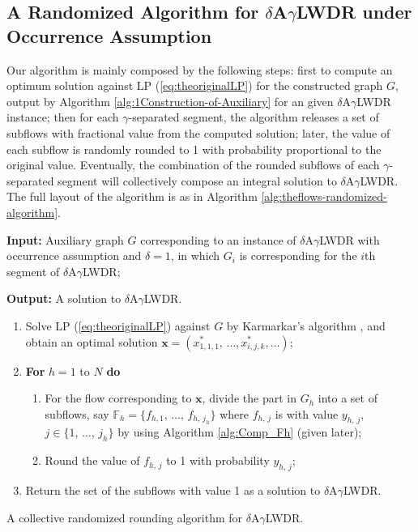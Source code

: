 \documentclass[11pt,english,onecolumn,draftcls]{IEEEtran}
\theoremstyle{plain}
\theoremstyle{plain}
\theoremstyle{plain}
\theoremstyle{plain}
\begin{document}
\subsection{A Randomized Algorithm for $\delta$A$\gamma$LWDR under Occurrence
Assumption}

Our algorithm is mainly composed by the following steps: first to
compute an optimum solution against LP (\ref{eq:theoriginalLP}) for
the constructed graph $G$, output by Algorithm \ref{alg:1Construction-of-Auxiliary}
for an given $\delta$A$\gamma$LWDR instance; then for each $\gamma$-separated
segment, the algorithm releases a set of subflows with fractional
value from the computed solution; later, the value of each subflow
is randomly rounded to 1 with probability proportional to the original
value. Eventually, the combination of the rounded subflows of each
$\gamma$-separated segment will collectively compose an integral
solution to $\delta$A$\gamma$LWDR. The full layout of the algorithm
is as in Algorithm \ref{alg:theflows-randomized-algorithm}.

\begin{algorithm}
\textbf{Input: }Auxiliary graph $G$ corresponding to an instance
of $\delta$A$\gamma$LWDR with occurrence assumption and $\delta=1$,
in which $G_{i}$ is corresponding for the $i$th segment of $\delta$A$\gamma$LWDR;

\textbf{Output:} A solution to $\delta$A$\gamma$LWDR.
\begin{enumerate}
\item Solve LP (\ref{eq:theoriginalLP}) against $G$ by Karmarkar's algorithm
\cite{schrijver1998theory}, and obtain an optimal solution $\mathbf{x}=(x_{1,1,1}^{*},\,\dots,x_{i,j,k}^{*},\dots)$;
\item \textbf{For} $h=1$ to $N$ \textbf{do}

\begin{enumerate}
\item For the flow corresponding to $\mathbf{x}$, divide the part in $G_{h}$
into a set of subflows, say $\mathbb{F}_{h}=\{f_{h,1},\,\dots,\, f_{h,\, j_{h}}\}$
where $f_{h,\, j}$ is with value $y_{h,\, j}$, $j\in\{1,\,\dots,\, j_{h}\}$ by
using Algorithm \ref{alg:Comp_Fh} (given later);
\item Round the value of $f{}_{h,\, j}$ to 1 with probability $y_{h,\, j}$;
\end{enumerate}
\item Return the set of the subflows with value 1 as a solution to $\delta$A$\gamma$LWDR.
\end{enumerate}
\protect\caption{\label{alg:theflows-randomized-algorithm}A collective randomized
rounding algorithm for $\delta$A$\gamma$LWDR.}
\end{algorithm}
\end{document}
